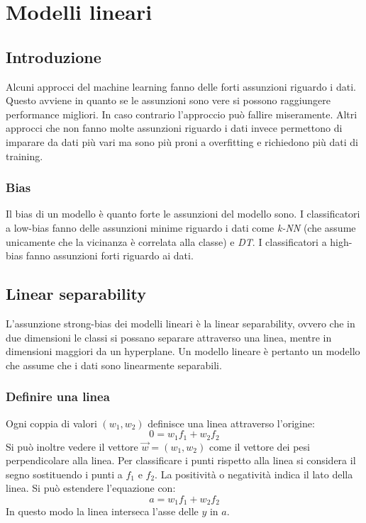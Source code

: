 \chapter{Modelli lineari}

\section{Introduzione}
Alcuni approcci del machine learning fanno delle forti assunzioni riguardo i dati.
Questo avviene in quanto se le assunzioni sono vere si possono raggiungere performance migliori.
In caso contrario l'approccio pu\`o fallire miseramente.
Altri approcci che non fanno molte assunzioni riguardo i dati invece permettono di imparare da dati pi\`u vari ma sono pi\`u proni a overfitting e richiedono pi\`u dati di training.

	\subsection{Bias}
	Il bias di un modello \`e quanto forte le assunzioni del modello sono.
	I classificatori a low-bias fanno delle assunzioni minime riguardo i dati come \emph{k-NN} (che assume unicamente che la vicinanza \`e correlata alla classe) e \emph{DT}.
	I classificatori a high-bias fanno assunzioni forti riguardo ai dati.

\section{Linear separability}
L'assunzione strong-bias dei modelli lineari \`e la linear separability, ovvero che in due dimensioni le classi si possano separare attraverso una linea, mentre in dimensioni maggiori da un hyperplane.
Un modello lineare \`e pertanto un modello che assume che i dati sono linearmente separabili.

	\subsection{Definire una linea}
	Ogni coppia di valori $(w_1,w_2)$ definisce una linea attraverso l'origine:
	$$0=w_1f_1+w_2f_2$$
	Si pu\`o inoltre vedere il vettore $\overrightarrow{w}=(w_1, w_2)$ come il vettore dei pesi perpendicolare alla linea.
	Per classificare i punti rispetto alla linea si considera il segno sostituendo i punti a $f_1$ e $f_2$.
	La positivit\`a o negativit\`a indica il lato della linea.
	Si pu\`o estendere l'equazione con:
	$$a=w_1f_1+w_2f_2$$
	In questo modo la linea interseca l'asse delle $y$ in $a$.


